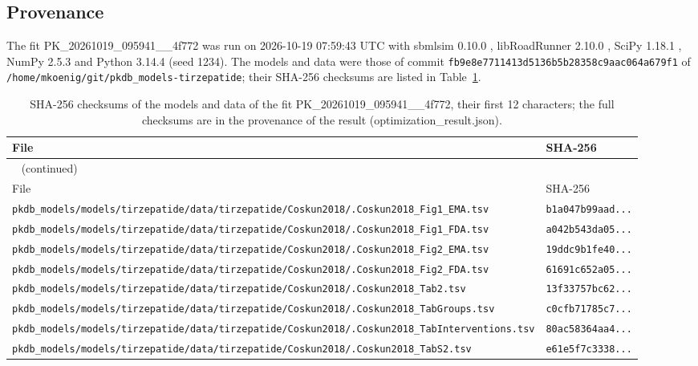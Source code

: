 \subsection{Provenance}

The fit PK\_20261019\_095941\_\_4f772 was run on 2026-10-19 07:59:43 UTC with sbmlsim 0.10.0 \cite{Koenig2026_sbmlsim}, libRoadRunner 2.10.0 \cite{Welsh2023}, SciPy 1.18.1 \cite{Virtanen2020}, NumPy 2.5.3 \cite{Harris2020} and Python 3.14.4 (seed 1234). The models and data were those of commit \texttt{fb9e8e7711413d5136b5b28358c9aac064a679f1} of \texttt{/home/mkoenig/git/pkdb\_models-tirzepatide}; their SHA-256 checksums are listed in Table~\ref{tab:checksums:PK_20261019_095941__4f772}.

\begin{longtable}{ll}
\caption{SHA-256 checksums of the models and data of the fit PK\_20261019\_095941\_\_4f772, their first 12 characters; the full checksums are in the provenance of the result (optimization\_result.json).}\label{tab:checksums:PK_20261019_095941__4f772} \\
\toprule
File & SHA-256 \\
\midrule
\endfirsthead
\multicolumn{2}{l}{\small\tablename~\thetable{} (continued)} \\
\toprule
File & SHA-256 \\
\midrule
\endhead
\bottomrule
\endlastfoot
\texttt{pkdb\_models/models/tirzepatide/data/tirzepatide/Coskun2018/.Coskun2018\_Fig1\_EMA.tsv} & \texttt{b1a047b99aad...} \\
\texttt{pkdb\_models/models/tirzepatide/data/tirzepatide/Coskun2018/.Coskun2018\_Fig1\_FDA.tsv} & \texttt{a042b543da05...} \\
\texttt{pkdb\_models/models/tirzepatide/data/tirzepatide/Coskun2018/.Coskun2018\_Fig2\_EMA.tsv} & \texttt{19ddc9b1fe40...} \\
\texttt{pkdb\_models/models/tirzepatide/data/tirzepatide/Coskun2018/.Coskun2018\_Fig2\_FDA.tsv} & \texttt{61691c652a05...} \\
\texttt{pkdb\_models/models/tirzepatide/data/tirzepatide/Coskun2018/.Coskun2018\_Tab2.tsv} & \texttt{13f33757bc62...} \\
\texttt{pkdb\_models/models/tirzepatide/data/tirzepatide/Coskun2018/.Coskun2018\_TabGroups.tsv} & \texttt{c0cfb71785c7...} \\
\texttt{pkdb\_models/models/tirzepatide/data/tirzepatide/Coskun2018/.Coskun2018\_TabInterventions.tsv} & \texttt{80ac58364aa4...} \\
\texttt{pkdb\_models/models/tirzepatide/data/tirzepatide/Coskun2018/.Coskun2018\_TabS2.tsv} & \texttt{e61e5f7c3338...} \\

\end{longtable}

